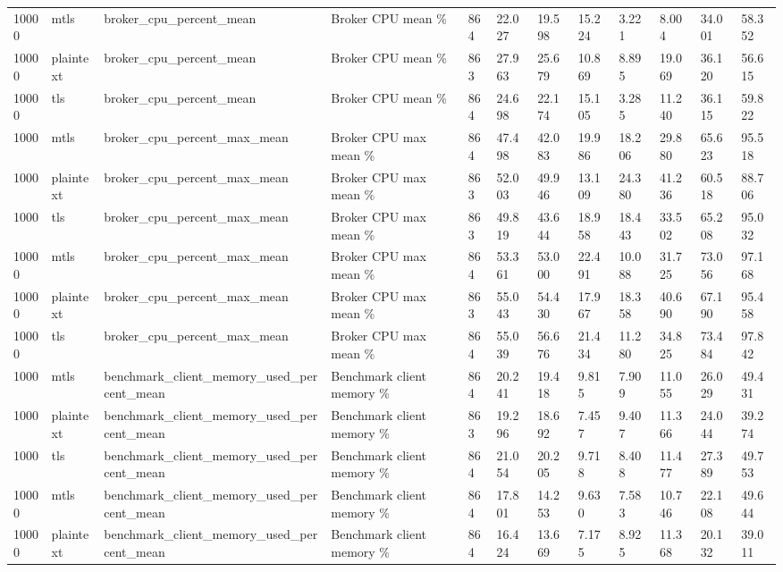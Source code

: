 \begin{longtable}{llllllllllll}
10000 & mtls & broker\_cpu\_percent\_mean & Broker CPU mean \% & 864 & 22.027 & 19.598 & 15.224 & 3.221 & 8.004 & 34.001 & 58.352 \\
10000 & plaintext & broker\_cpu\_percent\_mean & Broker CPU mean \% & 863 & 27.963 & 25.679 & 10.869 & 8.895 & 19.069 & 36.120 & 56.615 \\
10000 & tls & broker\_cpu\_percent\_mean & Broker CPU mean \% & 864 & 24.698 & 22.174 & 15.105 & 3.285 & 11.240 & 36.115 & 59.822 \\
1000 & mtls & broker\_cpu\_percent\_max\_mean & Broker CPU max mean \% & 864 & 47.498 & 42.083 & 19.986 & 18.206 & 29.880 & 65.623 & 95.518 \\
1000 & plaintext & broker\_cpu\_percent\_max\_mean & Broker CPU max mean \% & 863 & 52.003 & 49.946 & 13.109 & 24.380 & 41.236 & 60.518 & 88.706 \\
1000 & tls & broker\_cpu\_percent\_max\_mean & Broker CPU max mean \% & 863 & 49.819 & 43.644 & 18.958 & 18.443 & 33.502 & 65.208 & 95.032 \\
10000 & mtls & broker\_cpu\_percent\_max\_mean & Broker CPU max mean \% & 864 & 53.361 & 53.000 & 22.491 & 10.088 & 31.725 & 73.056 & 97.168 \\
10000 & plaintext & broker\_cpu\_percent\_max\_mean & Broker CPU max mean \% & 863 & 55.043 & 54.430 & 17.967 & 18.358 & 40.690 & 67.190 & 95.458 \\
10000 & tls & broker\_cpu\_percent\_max\_mean & Broker CPU max mean \% & 864 & 55.039 & 56.676 & 21.434 & 11.280 & 34.825 & 73.484 & 97.842 \\
1000 & mtls & benchmark\_client\_memory\_used\_percent\_mean & Benchmark client memory \% & 864 & 20.241 & 19.418 & 9.815 & 7.909 & 11.055 & 26.029 & 49.431 \\
1000 & plaintext & benchmark\_client\_memory\_used\_percent\_mean & Benchmark client memory \% & 863 & 19.296 & 18.692 & 7.457 & 9.407 & 11.366 & 24.044 & 39.274 \\
1000 & tls & benchmark\_client\_memory\_used\_percent\_mean & Benchmark client memory \% & 864 & 21.054 & 20.205 & 9.718 & 8.408 & 11.477 & 27.389 & 49.753 \\
10000 & mtls & benchmark\_client\_memory\_used\_percent\_mean & Benchmark client memory \% & 864 & 17.801 & 14.253 & 9.630 & 7.583 & 10.746 & 22.108 & 49.644 \\
10000 & plaintext & benchmark\_client\_memory\_used\_percent\_mean & Benchmark client memory \% & 864 & 16.424 & 13.669 & 7.175 & 8.925 & 11.368 & 20.132 & 39.011 \\

\end{longtable}
